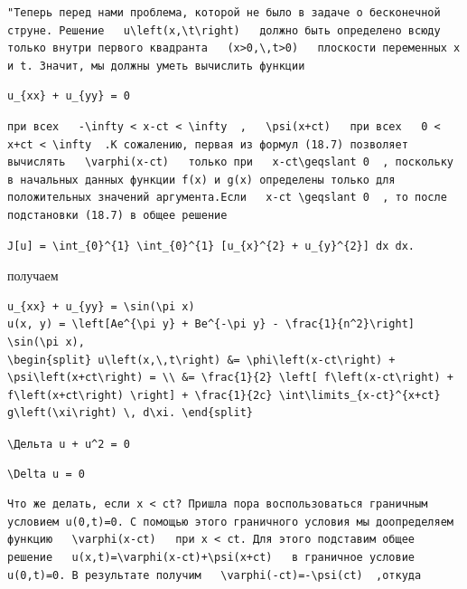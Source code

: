 \documentclass[
  ukrainian,
]{article}
\begin{document}
\begin{verbatim}
"Теперь перед нами проблема, которой не было в задаче о бесконечной струне. Решение   u\left(x,\t\right)   должно быть определено всюду только внутри первого квадранта   (x>0,\,t>0)   плоскости переменных x и t. Значит, мы должны уметь вычислить функции
\end{verbatim}

\begin{verbatim}
u_{xx} + u_{yy} = 0
\end{verbatim}

\begin{verbatim}
при всех   -\infty < x-ct < \infty  ,   \psi(x+ct)   при всех   0 < x+ct < \infty  .К сожалению, первая из формул (18.7) позволяет вычислять   \varphi(x-ct)   только при   x-ct\geqslant 0  , поскольку в начальных данных функции f(x) и g(x) определены только для положительных значений аргумента.Если   x-ct \geqslant 0  , то после подстановки (18.7) в общее решение
\end{verbatim}

\begin{verbatim}
J[u] = \int_{0}^{1} \int_{0}^{1} [u_{x}^{2} + u_{y}^{2}] dx dx.
\end{verbatim}

получаем

\begin{verbatim}
u_{xx} + u_{yy} = \sin(\pi x)
u(x, y) = \left[Ae^{\pi y} + Be^{-\pi y} - \frac{1}{n^2}\right] \sin(\pi x),
\begin{split} u\left(x,\,t\right) &= \phi\left(x-ct\right) + \psi\left(x+ct\right) = \\ &= \frac{1}{2} \left[ f\left(x-ct\right) + f\left(x+ct\right) \right] + \frac{1}{2c} \int\limits_{x-ct}^{x+ct} g\left(\xi\right) \, d\xi. \end{split}
\end{verbatim}

\texttt{\textbackslash{}Дельта\ u\ +\ u\^{}2\ =\ 0}

\begin{verbatim}
\Delta u = 0
\end{verbatim}

\begin{verbatim}
Что же делать, если x < ct? Пришла пора воспользоваться граничным условием u(0,t)=0. С помощью этого граничного условия мы доопределяем функцию   \varphi(x-ct)   при x < ct. Для этого подставим общее решение   u(x,t)=\varphi(x-ct)+\psi(x+ct)   в граничное условие u(0,t)=0. В результате получим   \varphi(-ct)=-\psi(ct)  ,откуда
\end{verbatim}
\end{document}
